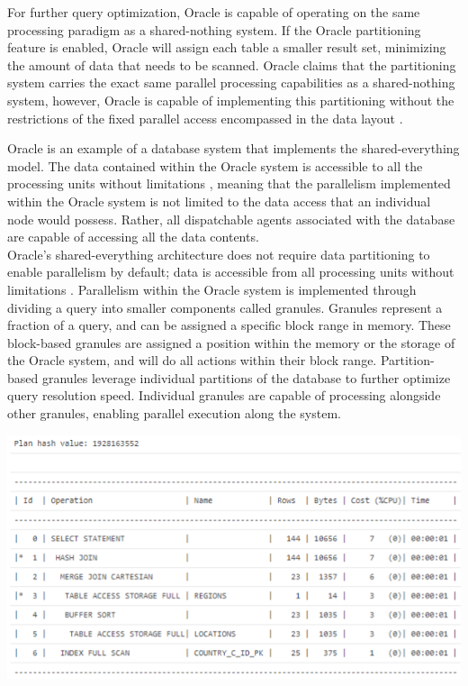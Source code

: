 \documentclass[onecolumn, draftclsnofoot,10pt, compsoc]{IEEEtran}
\begin{document}
\indent For further query optimization, Oracle is capable of operating on the same processing paradigm as a shared-nothing system.
If the Oracle partitioning feature is enabled, Oracle will assign each table a smaller result set, minimizing the amount of data that needs to be scanned. 
Oracle claims that the partitioning system carries the exact same parallel processing capabilities as a shared-nothing system, however, Oracle is capable of implementing this partitioning without the restrictions of the fixed parallel access encompassed in the data layout \cite{OraclePEwODF}.  

   \indent  Oracle is an example of a database system that implements the shared-everything model. The data contained within the Oracle system is accessible to all the processing units without limitations \cite{OraclePEwODF}, meaning that the parallelism implemented within the Oracle system is not limited to the data access that an individual node would possess. Rather, all dispatchable agents associated with the database are capable of accessing all the data contents. \\

\indent Oracle’s shared-everything architecture does not require data partitioning to enable parallelism by default; data is accessible from all processing units without limitations \cite{OraclePEwODF}. Parallelism within the Oracle system is implemented through dividing a query into smaller components called granules. Granules represent a fraction of a query, and can be assigned a specific block range in memory. These block-based granules are assigned a position within the memory or the storage of the Oracle system, and will do all actions within their block range. Partition-based granules leverage individual partitions of the database to further optimize query resolution speed. Individual granules are capable of processing alongside other granules, enabling parallel execution along the system. 

\includegraphics{nickImage}
\end{document}
